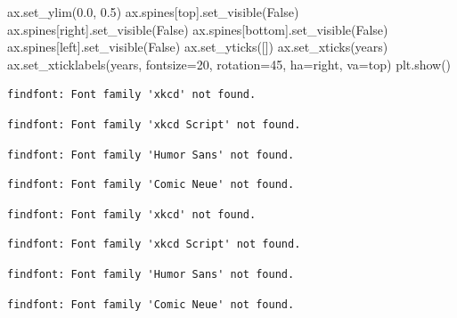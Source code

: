 \documentclass[
  letterpaper,
  DIV=11,
  numbers=noendperiod]{scrartcl}
\newenvironment{Shaded}{\begin{snugshade}}{\end{snugshade}}
\newcommand{\DecValTok}[1]{\textcolor[rgb]{0.68,0.00,0.00}{#1}}
\newcommand{\FloatTok}[1]{\textcolor[rgb]{0.68,0.00,0.00}{#1}}
\newcommand{\NormalTok}[1]{\textcolor[rgb]{0.00,0.23,0.31}{#1}}
\newcommand{\OperatorTok}[1]{\textcolor[rgb]{0.37,0.37,0.37}{#1}}
\newcommand{\StringTok}[1]{\textcolor[rgb]{0.13,0.47,0.30}{#1}}
\newcommand{\VariableTok}[1]{\textcolor[rgb]{0.07,0.07,0.07}{#1}}
\begin{document}
\begin{Shaded}
\begin{Highlighting}[]
\NormalTok{ax.set\_ylim(}\FloatTok{0.0}\NormalTok{, }\FloatTok{0.5}\NormalTok{)}
\NormalTok{ax.spines[}\StringTok{\textquotesingle{}top\textquotesingle{}}\NormalTok{].set\_visible(}\VariableTok{False}\NormalTok{)}
\NormalTok{ax.spines[}\StringTok{\textquotesingle{}right\textquotesingle{}}\NormalTok{].set\_visible(}\VariableTok{False}\NormalTok{)}
\NormalTok{ax.spines[}\StringTok{\textquotesingle{}bottom\textquotesingle{}}\NormalTok{].set\_visible(}\VariableTok{False}\NormalTok{)}
\NormalTok{ax.spines[}\StringTok{\textquotesingle{}left\textquotesingle{}}\NormalTok{].set\_visible(}\VariableTok{False}\NormalTok{)}
\NormalTok{ax.set\_yticks([])}
\NormalTok{ax.set\_xticks(years)}
\NormalTok{ax.set\_xticklabels(years, fontsize}\OperatorTok{=}\DecValTok{20}\NormalTok{, rotation}\OperatorTok{=}\DecValTok{45}\NormalTok{, ha}\OperatorTok{=}\StringTok{\textquotesingle{}right\textquotesingle{}}\NormalTok{, va}\OperatorTok{=}\StringTok{\textquotesingle{}top\textquotesingle{}}\NormalTok{)}
\NormalTok{plt.show()}
\end{Highlighting}
\end{Shaded}

\begin{verbatim}
findfont: Font family 'xkcd' not found.
\end{verbatim}

\begin{verbatim}
findfont: Font family 'xkcd Script' not found.
\end{verbatim}

\begin{verbatim}
findfont: Font family 'Humor Sans' not found.
\end{verbatim}

\begin{verbatim}
findfont: Font family 'Comic Neue' not found.
\end{verbatim}

\begin{verbatim}
findfont: Font family 'xkcd' not found.
\end{verbatim}

\begin{verbatim}
findfont: Font family 'xkcd Script' not found.
\end{verbatim}

\begin{verbatim}
findfont: Font family 'Humor Sans' not found.
\end{verbatim}

\begin{verbatim}
findfont: Font family 'Comic Neue' not found.
\end{verbatim}
\end{document}
